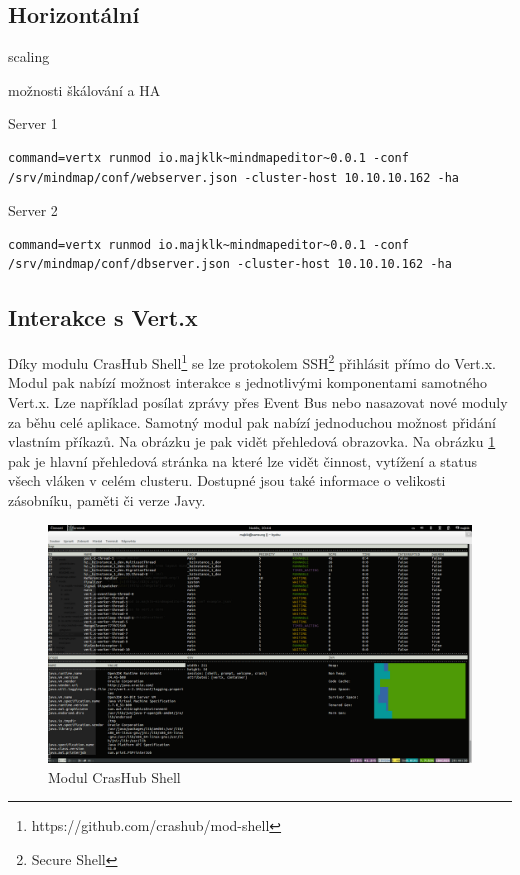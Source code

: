 \subsection{Horizontální}

scaling

možnosti škálování a HA

Server 1
\begin{lstlisting}
command=vertx runmod io.majklk~mindmapeditor~0.0.1 -conf /srv/mindmap/conf/webserver.json -cluster-host 10.10.10.162 -ha
\end{lstlisting}

Server 2
\begin{lstlisting}
command=vertx runmod io.majklk~mindmapeditor~0.0.1 -conf /srv/mindmap/conf/dbserver.json -cluster-host 10.10.10.162 -ha
\end{lstlisting}

\subsection{Interakce s Vert.x}\label{sub:interaction}

Díky modulu CrasHub Shell\footnote{https://github.com/crashub/mod-shell} se lze protokolem SSH\footnote{Secure Shell} přihlásit přímo do Vert.x. Modul pak nabízí možnost interakce s jednotlivými komponentami samotného Vert.x. Lze například posílat zprávy přes Event Bus nebo nasazovat nové moduly za běhu celé aplikace. Samotný modul pak nabízí jednoduchou možnost přidání vlastním příkazů. Na obrázku je pak vidět přehledová obrazovka. Na obrázku \ref{fig:real_interaction} pak je hlavní přehledová stránka na které lze vidět činnost, vytížení a status všech vláken v celém clusteru. Dostupné jsou také informace o velikosti zásobníku, paměti či verze Javy. 

\begin{figure}
\begin{centering}
\includegraphics[scale=0.21]{obrazky/real_interaction}
\par\end{centering}
\caption{Modul CrasHub Shell\label{fig:real_interaction}}
\end{figure}

